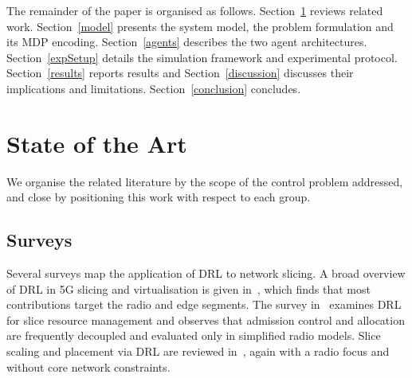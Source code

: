 \documentclass[10pt,journal,comsoc]{IEEEtran}
\begin{document}
The remainder of the paper is organised as follows.
Section~\ref{State_of_Art} reviews related work.
Section~\ref{model} presents the system model, the problem formulation
and its MDP encoding. Section~\ref{agents} describes the two agent
architectures. Section~\ref{expSetup} details the simulation framework
and experimental protocol. Section~\ref{results} reports results and
Section~\ref{discussion} discusses their implications and limitations.
Section~\ref{conclusion} concludes.

\section{State of the Art} \label{State_of_Art}
We organise the related literature by the scope of the control problem
addressed, and close by positioning this work with respect to each group.

\subsection{Surveys}
Several surveys map the application of DRL to network slicing.
A broad overview of DRL in 5G slicing and virtualisation is given
in~\cite{ssengonzi2022survey}, which finds that most contributions target
the radio and edge segments. The survey in~\cite{hurtado2022deep}
examines DRL for slice resource management and observes that admission
control and allocation are frequently decoupled and evaluated only in
simplified radio models. Slice scaling and placement via DRL are reviewed
in~\cite{saha2023deep}, again with a radio focus and without core network
constraints.
\end{document}
